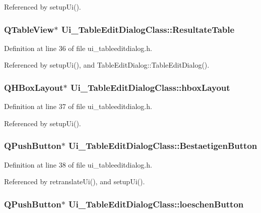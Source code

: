 Referenced by setupUi().\hypertarget{class_ui___table_edit_dialog_class_49cbc22d11fa57a282ac9e3b9a93fadd}{
\subsubsection[ResultateTable]{\setlength{\rightskip}{0pt plus 5cm}QTableView$\ast$ {\bf Ui\_\-TableEditDialogClass::ResultateTable}}}
\label{class_ui___table_edit_dialog_class_49cbc22d11fa57a282ac9e3b9a93fadd}




Definition at line 36 of file ui\_\-tableeditdialog.h.

Referenced by setupUi(), and TableEditDialog::TableEditDialog().\hypertarget{class_ui___table_edit_dialog_class_75664dfae4f088d5bb91b5bbbb989e7a}{
\subsubsection[hboxLayout]{\setlength{\rightskip}{0pt plus 5cm}QHBoxLayout$\ast$ {\bf Ui\_\-TableEditDialogClass::hboxLayout}}}
\label{class_ui___table_edit_dialog_class_75664dfae4f088d5bb91b5bbbb989e7a}




Definition at line 37 of file ui\_\-tableeditdialog.h.

Referenced by setupUi().\hypertarget{class_ui___table_edit_dialog_class_e37f5f2d1f208ca7d32201e2781b5886}{
\subsubsection[BestaetigenButton]{\setlength{\rightskip}{0pt plus 5cm}QPushButton$\ast$ {\bf Ui\_\-TableEditDialogClass::BestaetigenButton}}}
\label{class_ui___table_edit_dialog_class_e37f5f2d1f208ca7d32201e2781b5886}




Definition at line 38 of file ui\_\-tableeditdialog.h.

Referenced by retranslateUi(), and setupUi().\hypertarget{class_ui___table_edit_dialog_class_b6c29b0ffda82912df837a47203f8ff3}{
\subsubsection[loeschenButton]{\setlength{\rightskip}{0pt plus 5cm}QPushButton$\ast$ {\bf Ui\_\-TableEditDialogClass::loeschenButton}}}
\label{class_ui___table_edit_dialog_class_b6c29b0ffda82912df837a47203f8ff3}




